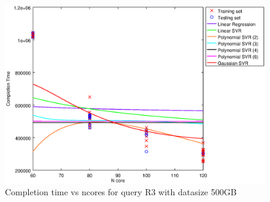 
\begin {figure}[hbtp]
\centering
\includegraphics[width=\textwidth]{output/R3_500_1_OVER_NCORES/plot_R3_500.eps}
\caption{Completion time vs ncores for query R3 with datasize 500GB}
\label{fig:all_nonlinear_R3_500}
\end {figure}
